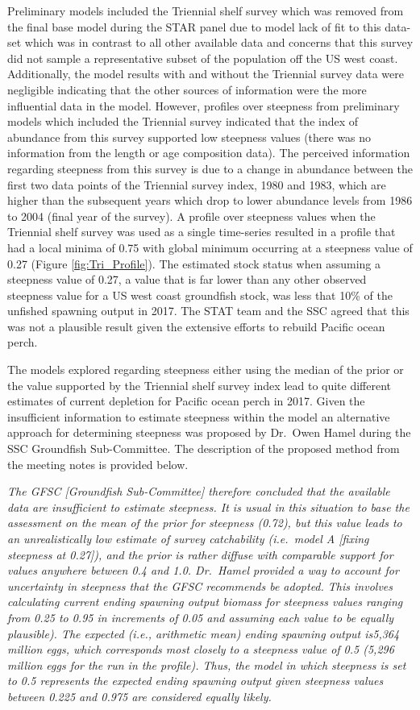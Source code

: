 \documentclass[12pt,]{article}
\begin{document}
Preliminary models included the Triennial shelf survey which was removed
from the final base model during the STAR panel due to model lack of fit
to this data-set which was in contrast to all other available data and
concerns that this survey did not sample a representative subset of the
population off the US west coast. Additionally, the model results with
and without the Triennial survey data were negligible indicating that
the other sources of information were the more influential data in the
model. However, profiles over steepness from preliminary models which
included the Triennial survey indicated that the index of abundance from
this survey supported low steepness values (there was no information
from the length or age composition data). The perceived information
regarding steepness from this survey is due to a change in abundance
between the first two data points of the Triennial survey index, 1980
and 1983, which are higher than the subsequent years which drop to lower
abundance levels from 1986 to 2004 (final year of the survey). A profile
over steepness values when the Triennial shelf survey was used as a
single time-series resulted in a profile that had a local minima of 0.75
with global minimum occurring at a steepness value of 0.27 (Figure
\ref{fig:Tri_Profile}). The estimated stock status when assuming a
steepness value of 0.27, a value that is far lower than any other
observed steepness value for a US west coast groundfish stock, was less
that 10\% of the unfished spawning output in 2017. The STAT team and the
SSC agreed that this was not a plausible result given the extensive
efforts to rebuild Pacific ocean perch.

The models explored regarding steepness either using the median of the
prior or the value supported by the Triennial shelf survey index lead to
quite different estimates of current depletion for Pacific ocean perch
in 2017. Given the insufficient information to estimate steepness within
the model an alternative approach for determining steepness was proposed
by Dr.~Owen Hamel during the SSC Groundfish Sub-Committee. The
description of the proposed method from the meeting notes is provided
below.

\emph{The GFSC {[}Groundfish Sub-Committee{]} therefore concluded that
the available data are insufficient to estimate steepness. It is usual
in this situation to base the assessment on the mean of the prior for
steepness (0.72), but this value leads to an unrealistically low
estimate of survey catchability (i.e.~model A {[}fixing steepness at
0.27{]}), and the prior is rather diffuse with comparable support for
values anywhere between 0.4 and 1.0. Dr.~Hamel provided a way to account
for uncertainty in steepness that the GFSC recommends be adopted. This
involves calculating current ending spawning output biomass for
steepness values ranging from 0.25 to 0.95 in increments of 0.05 and
assuming each value to be equally plausible). The expected (i.e.,
arithmetic mean) ending spawning output is5,364 million eggs, which
corresponds most closely to a steepness value of 0.5 (5,296 million eggs
for the run in the profile). Thus, the model in which steepness is set
to 0.5 represents the expected ending spawning output given steepness
values between 0.225 and 0.975 are considered equally likely.}
\end{document}
